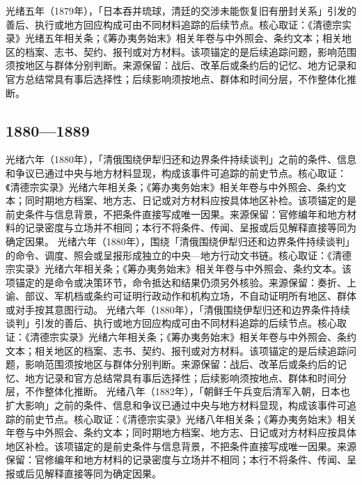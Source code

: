 光绪五年（1879年），「日本吞并琉球，清廷的交涉未能恢复旧有册封关系」引发的善后、执行或地方回应构成可由不同材料追踪的后续节点。核心取证：《清德宗实录》光绪五年相关条；《筹办夷务始末》相关年卷与中外照会、条约文本；相关地区的档案、志书、契约、报刊或对方材料。该项锚定的是后续追踪问题，影响范围须按地区与群体分别判断。来源保留：战后、改革后或条约后的记忆、地方记录和官方总结常具有事后选择性；后续影响须按地点、群体和时间分层，不作整体化推断。
\subsection{1880—1889}
光绪六年（1880年），「清俄围绕伊犁归还和边界条件持续谈判」之前的条件、信息和争议已通过中央与地方材料显现，构成该事件可追踪的前史节点。核心取证：《清德宗实录》光绪六年相关条；《筹办夷务始末》相关年卷与中外照会、条约文本；同时期地方档案、地方志、日记或对方材料应按具体地区补检。该项锚定的是前史条件与信息背景，不把条件直接写成唯一因果。来源保留：官修编年和地方材料的记录密度与立场并不相同；本行不将条件、传闻、呈报或后见解释直接等同为确定因果。
光绪六年（1880年），围绕「清俄围绕伊犁归还和边界条件持续谈判」的命令、调度、照会或呈报形成独立的中央—地方行动文书链。核心取证：《清德宗实录》光绪六年相关条；《筹办夷务始末》相关年卷与中外照会、条约文本。该项锚定的是命令或决策环节，命令抵达和结果仍须另外核验。来源保留：奏折、上谕、部议、军机档或条约可证明行政动作和机构立场，不自动证明所有地区、群体或对手按其意图行动。
光绪六年（1880年），「清俄围绕伊犁归还和边界条件持续谈判」引发的善后、执行或地方回应构成可由不同材料追踪的后续节点。核心取证：《清德宗实录》光绪六年相关条；《筹办夷务始末》相关年卷与中外照会、条约文本；相关地区的档案、志书、契约、报刊或对方材料。该项锚定的是后续追踪问题，影响范围须按地区与群体分别判断。来源保留：战后、改革后或条约后的记忆、地方记录和官方总结常具有事后选择性；后续影响须按地点、群体和时间分层，不作整体化推断。
光绪八年（1882年），「朝鲜壬午兵变后清军入朝，日本也扩大影响」之前的条件、信息和争议已通过中央与地方材料显现，构成该事件可追踪的前史节点。核心取证：《清德宗实录》光绪八年相关条；《筹办夷务始末》相关年卷与中外照会、条约文本；同时期地方档案、地方志、日记或对方材料应按具体地区补检。该项锚定的是前史条件与信息背景，不把条件直接写成唯一因果。来源保留：官修编年和地方材料的记录密度与立场并不相同；本行不将条件、传闻、呈报或后见解释直接等同为确定因果。
